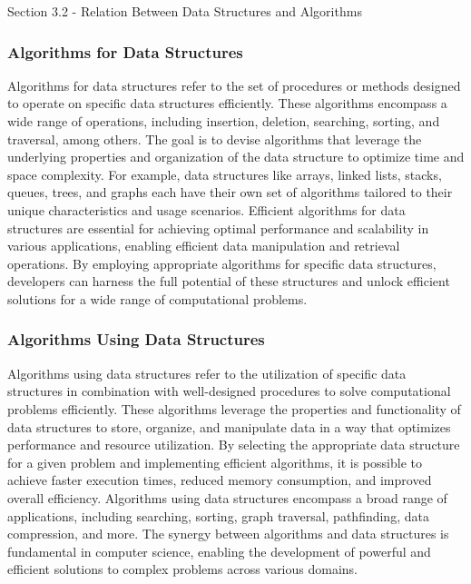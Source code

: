 \begin{notes}{Section 3.2 - Relation Between Data Structures and Algorithms}
    \subsubsection*{Algorithms for Data Structures}

    Algorithms for data structures refer to the set of procedures or methods designed to operate on specific data structures efficiently. These algorithms encompass a wide range of operations, including insertion, deletion, searching, sorting, and traversal, among others. The goal is to devise algorithms that leverage the underlying properties and organization of the data structure to optimize time and space complexity. For example, data structures 
    like arrays, linked lists, stacks, queues, trees, and graphs each have their own set of algorithms tailored to their unique characteristics and usage scenarios. Efficient algorithms for data structures are essential for achieving optimal performance and scalability in various applications, enabling efficient data manipulation and retrieval operations. By employing appropriate algorithms for specific data structures, developers can harness the 
    full potential of these structures and unlock efficient solutions for a wide range of computational problems.
    
    \subsubsection*{Algorithms Using Data Structures}
    
    Algorithms using data structures refer to the utilization of specific data structures in combination with well-designed procedures to solve computational problems efficiently. These algorithms leverage the properties and functionality of data structures to store, organize, and manipulate data in a way that optimizes performance and resource utilization. By selecting the appropriate data structure for a given problem and implementing efficient 
    algorithms, it is possible to achieve faster execution times, reduced memory consumption, and improved overall efficiency. Algorithms using data structures encompass a broad range of applications, including searching, sorting, graph traversal, pathfinding, data compression, and more. The synergy between algorithms and data structures is fundamental in computer science, enabling the development of powerful and efficient solutions to complex 
    problems across various domains.
    

\end{notes}
